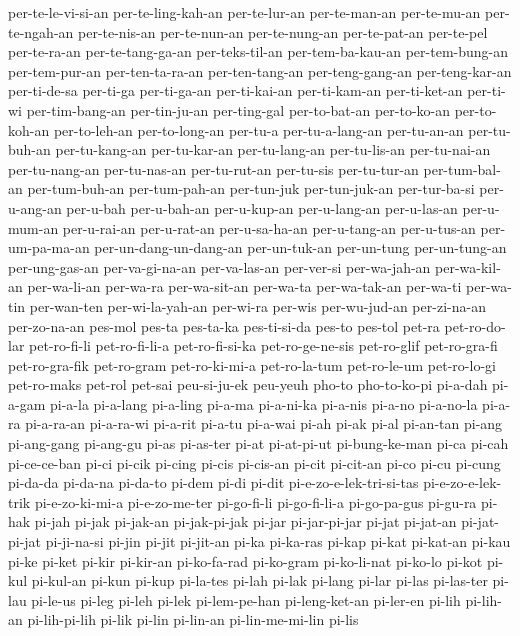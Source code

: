 {per-te-le-vi-si-an per-te-ling-kah-an per-te-lur-an per-te-man-an
per-te-mu-an per-te-ngah-an per-te-nis-an per-te-nun-an per-te-nung-an
per-te-pat-an per-te-pel per-te-ra-an per-te-tang-ga-an per-teks-til-an
per-tem-ba-kau-an per-tem-bung-an per-tem-pur-an per-ten-ta-ra-an
per-ten-tang-an per-teng-gang-an per-teng-kar-an per-ti-de-sa per-ti-ga
per-ti-ga-an per-ti-kai-an per-ti-kam-an per-ti-ket-an per-ti-wi
per-tim-bang-an per-tin-ju-an per-ting-gal per-to-bat-an per-to-ko-an
per-to-koh-an per-to-leh-an per-to-long-an per-tu-a per-tu-a-lang-an
per-tu-an-an per-tu-buh-an per-tu-kang-an per-tu-kar-an per-tu-lang-an
per-tu-lis-an per-tu-nai-an per-tu-nang-an per-tu-nas-an per-tu-rut-an
per-tu-sis per-tu-tur-an per-tum-bal-an per-tum-buh-an per-tum-pah-an
per-tun-juk per-tun-juk-an per-tur-ba-si per-u-ang-an per-u-bah
per-u-bah-an per-u-kup-an per-u-lang-an per-u-las-an per-u-mum-an
per-u-rai-an per-u-rat-an per-u-sa-ha-an per-u-tang-an per-u-tus-an
per-um-pa-ma-an per-un-dang-un-dang-an per-un-tuk-an per-un-tung
per-un-tung-an per-ung-gas-an per-va-gi-na-an per-va-las-an per-ver-si
per-wa-jah-an per-wa-kil-an per-wa-li-an per-wa-ra per-wa-sit-an per-wa-ta
per-wa-tak-an per-wa-ti per-wa-tin per-wan-ten per-wi-la-yah-an per-wi-ra
per-wis per-wu-jud-an per-zi-na-an per-zo-na-an pes-mol pes-ta pes-ta-ka
pes-ti-si-da pes-to pes-tol pet-ra pet-ro-do-lar pet-ro-fi-li
pet-ro-fi-li-a pet-ro-fi-si-ka pet-ro-ge-ne-sis pet-ro-glif pet-ro-gra-fi
pet-ro-gra-fik pet-ro-gram pet-ro-ki-mi-a pet-ro-la-tum pet-ro-le-um
pet-ro-lo-gi pet-ro-maks pet-rol pet-sai peu-si-ju-ek peu-yeuh pho-to
pho-to-ko-pi pi-a-dah pi-a-gam pi-a-la pi-a-lang pi-a-ling pi-a-ma
pi-a-ni-ka pi-a-nis pi-a-no pi-a-no-la pi-a-ra pi-a-ra-an pi-a-ra-wi
pi-a-rit pi-a-tu pi-a-wai pi-ah pi-ak pi-al pi-an-tan pi-ang pi-ang-gang
pi-ang-gu pi-as pi-as-ter pi-at pi-at-pi-ut pi-bung-ke-man pi-ca pi-cah
pi-ce-ce-ban pi-ci pi-cik pi-cing pi-cis pi-cis-an pi-cit pi-cit-an pi-co
pi-cu pi-cung pi-da-da pi-da-na pi-da-to pi-dem pi-di pi-dit
pi-e-zo-e-lek-tri-si-tas pi-e-zo-e-lek-trik pi-e-zo-ki-mi-a pi-e-zo-me-ter
pi-go-fi-li pi-go-fi-li-a pi-go-pa-gus pi-gu-ra pi-hak pi-jah pi-jak
pi-jak-an pi-jak-pi-jak pi-jar pi-jar-pi-jar pi-jat pi-jat-an
pi-jat-pi-jat pi-ji-na-si pi-jin pi-jit pi-jit-an pi-ka pi-ka-ras pi-kap
pi-kat pi-kat-an pi-kau pi-ke pi-ket pi-kir pi-kir-an pi-ko-fa-rad
pi-ko-gram pi-ko-li-nat pi-ko-lo pi-kot pi-kul pi-kul-an pi-kun pi-kup
pi-la-tes pi-lah pi-lak pi-lang pi-lar pi-las pi-las-ter pi-lau pi-le-us
pi-leg pi-leh pi-lek pi-lem-pe-han pi-leng-ket-an pi-ler-en pi-lih
pi-lih-an pi-lih-pi-lih pi-lik pi-lin pi-lin-an pi-lin-me-mi-lin pi-lis
}
